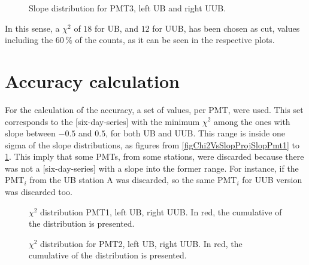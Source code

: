 \documentclass[twoside, final, 10pt]{articleMine}
\begin{document}
\begin{figure}[!t]
  \centering
  \caption{Slope distribution for PMT3, left UB and right UUB.}
  \label{figChi2VsSlopProjSlopPmt3} 
\end{figure}

In this sense, a $\chi^2$ of $18$ for UB, and $12$ for UUB, has
been chosen as cut, values including the $60\,\%$ of the counts,
as it can be seen in the respective plots.

\section{Accuracy calculation}

For the calculation of the accuracy, a set of \qpkvem values, per
PMT, were used. This set corresponds to the [six-day-series] with
the minimum $\chi^2$ among the ones with slope between $-0.5$ and
$0.5$, for both UB and UUB. This range is inside one sigma of the
slope distributions, as figures from
\ref{figChi2VsSlopProjSlopPmt1} to
\ref{figChi2VsSlopProjSlopPmt3}. This imply that some PMTs, from
some stations, were discarded because there was not a
[six-day-series] with a slope into the former range. For
instance, if the PMT$_i$ from the UB station A was discarded, so
the same PMT$_i$ for UUB version was discarded too.
\clearpage

\begin{figure}[!t]
  \centering
  \caption{$\chi^2$ distribution PMT1, left UB, right UUB. In
  red, the cumulative of the distribution is presented.}
  \label{figChi2VsSlopProjChi2Pmt1}
\end{figure}

\begin{figure}[!t]
  \centering
  \caption{$\chi^2$ distribution for PMT2, left UB, right UUB. In
  red, the cumulative of the distribution is presented.}
  \label{figChi2VsSlopProjChi2Pmt2}
\end{figure}
\end{document}
